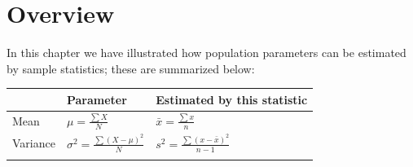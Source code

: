 \documentclass[
]{krantz}
\begin{document}
\hypertarget{overview-1}{%
\section{Overview}\label{overview-1}}

In this chapter we have illustrated how population parameters can be estimated by sample statistics; these are summarized below:

\doublespacing

\begin{longtable}[]{@{}lll@{}}
\toprule
\begin{minipage}[b]{0.30\columnwidth}\raggedright
\strut
\end{minipage} & \begin{minipage}[b]{0.30\columnwidth}\raggedright
Parameter\strut
\end{minipage} & \begin{minipage}[b]{0.30\columnwidth}\raggedright
Estimated by this statistic\strut
\end{minipage}\tabularnewline
\midrule
\endhead
\begin{minipage}[t]{0.30\columnwidth}\raggedright
Mean\strut
\end{minipage} & \begin{minipage}[t]{0.30\columnwidth}\raggedright
\(\mu = \frac{\sum{X}}{N}\)\strut
\end{minipage} & \begin{minipage}[t]{0.30\columnwidth}\raggedright
\(\bar{x} = \frac{\sum{x}}{n}\)\strut
\end{minipage}\tabularnewline
\begin{minipage}[t]{0.30\columnwidth}\raggedright
Variance\strut
\end{minipage} & \begin{minipage}[t]{0.30\columnwidth}\raggedright
\(\sigma^2 = \frac{\sum{(X - \mu)^2}}{N}\)\strut
\end{minipage} & \begin{minipage}[t]{0.30\columnwidth}\raggedright
\(s^2 = \frac{\sum{(x - \bar{x})^2}}{n-1}\)\strut
\end{minipage}\tabularnewline
\begin{minipage}[t]{0.30\columnwidth}\raggedright
\strut
\end{minipage} & \begin{minipage}[t]{0.30\columnwidth}\raggedright
\strut
\end{minipage} & \begin{minipage}[t]{0.30\columnwidth}\raggedright

\end{minipage}
\end{longtable}
\end{document}
